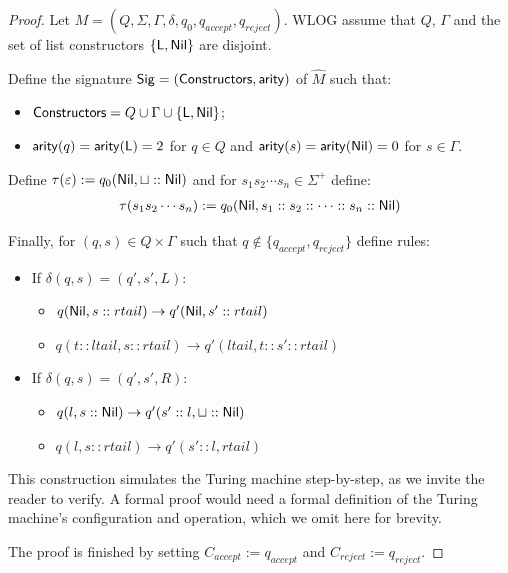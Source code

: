 \documentclass[11pt]{article}
\begin{document}
\begin{proof}
Let $M = (Q, \Sigma, \Gamma, \delta, q_0, q_{accept}, q_{reject})$. WLOG assume that
$Q$, $\Gamma$ and the set of list constructors $\{\mathsf{L}, \mathsf{Nil}\}$
are disjoint.

Define the signature $\mathsf{Sig} = (\mathsf{Constructors}, \mathsf{arity})$ of $\hat M$ such that:
\begin{itemize}
  \item $\mathsf{Constructors} = Q \cup \Gamma \cup \{\mathsf{L}, \mathsf{Nil}\}$;
  \item $\mathsf{arity}(q) = \mathsf{arity}(\mathsf{L}) = 2$ for $q \in Q$ and
  $\mathsf{arity}(s) = \mathsf{arity}(\mathsf{Nil}) = 0$ for $s \in \Gamma$.
\end{itemize}

Define $\tau(\varepsilon) := q_0 (\mathsf{Nil}, \sqcup :: \mathsf{Nil})$ and for
$s_1 s_2 \cdots s_n \in \Sigma^+$ define:
\begin{align*}
  \tau(s_1 s_2 \cdots s_n) := q_0 (\mathsf{Nil}, s_1 :: s_2 :: \dots :: s_n :: \mathsf{Nil})
\end{align*}

Finally, for $(q, s) \in Q \times \Gamma$ such that $q \notin \{q_{accept}, q_{reject}\}$ define rules:
\begin{itemize}
  \item If $\delta(q, s) = (q', s', L)$:
  \begin{itemize}
    \item $q(\mathsf{Nil}, s :: rtail) \to q'(\mathsf{Nil}, s' :: rtail)$
    \item $q(t :: ltail, s :: rtail) \to q'(ltail, t :: s' :: rtail)$
  \end{itemize}
  \item If $\delta(q, s) = (q', s', R)$:
  \begin{itemize}
    \item $q(l, s :: \mathsf{Nil}) \to q'(s' :: l, \sqcup :: \mathsf{Nil})$
    \item $q(l, s :: rtail) \to q'(s' :: l, rtail)$
  \end{itemize}
\end{itemize}

This construction simulates the Turing machine step-by-step, as we invite the reader
to verify. A formal proof would need a formal definition of the Turing machine's
configuration and operation, which we omit here for brevity.

The proof is finished by setting $C_{accept} := q_{accept}$ and $C_{reject} := q_{reject}$.
\end{proof}
\end{document}
